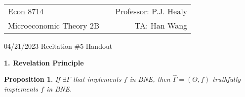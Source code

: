 \documentclass[11pt,leqno]{article}
\newtheorem{proposition}{Proposition}
\begin{document}
	
	
	\vspace*{-20mm}
	
	\begin{tabular*}{\textwidth}{@{\extracolsep{\fill}}lcr}
		Econ 8714     & \hfill    &         Professor: P.J. Healy          \\
		Microeconomic Theory 2B  &           &   TA: Han Wang    
	\end{tabular*}
	
	\bigskip
	\begin{center}
		{\Large 04/21/2023 Recitation \#5 Handout}
	\end{center}
	
	\bigskip
	
	
	\textbf{1. Revelation Principle}
	
	\begin{proposition}
		If $\exists \Gamma$ that implements $f$ in BNE, then $\hat{\Gamma}=(\Theta,f)$ truthfully implements $f$ in BNE.
	\end{proposition}
	
\end{document}
